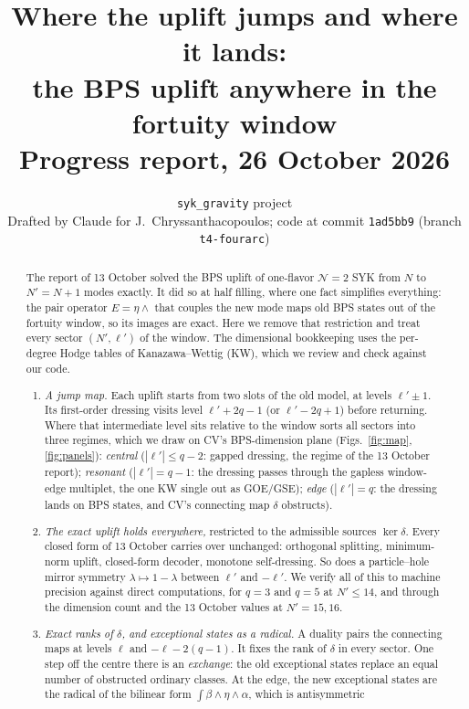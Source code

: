 \documentclass[11pt]{article}
\title{\bf Where the uplift jumps and where it lands:\\ the BPS uplift anywhere in the fortuity window\\[6pt]\large Progress report, 26 October 2026}
\author{\texttt{syk\_gravity} project\\[2pt]\small Drafted by Claude for J.~Chryssanthacopoulos; code at commit
\texttt{1ad5bb9} (branch \texttt{t4-fourarc})}
\date{}
\newcommand{\Np}{N'}
\newcommand{\lp}{\ell'}
\theoremstyle{plain}
\theoremstyle{remark}
\numberwithin{equation}{section}
\begin{document}
\maketitle

\begin{abstract}
\noindent
The report of 13 October solved the BPS uplift of one-flavor $\mathcal N=2$ SYK from $N$ to $\Np=N+1$ modes exactly. It
did so at half filling, where one fact simplifies everything: the pair operator $E=\eta\wedge$ that couples the new mode
maps old BPS states out of the fortuity window, so its images are exact. Here we remove that restriction and treat
every sector $(\Np,\lp)$ of the window. The dimensional bookkeeping uses the per-degree Hodge tables of
Kanazawa--Wettig (KW), which we review and check against our code.
\begin{enumerate}\itemsep1pt
\item \emph{A jump map.} Each uplift starts from two slots of the old model, at levels $\lp\pm1$. Its first-order
dressing visits level $\lp+2q-1$ (or $\lp-2q+1$) before returning. Where that intermediate level sits relative to the
window sorts all sectors into three regimes, which we draw on CV's BPS-dimension plane (Figs.~\ref{fig:map},
\ref{fig:panels}):
\emph{central} ($|\lp|\le q-2$: gapped dressing, the regime of the 13 October report);
\emph{resonant} ($|\lp|=q-1$: the dressing passes through the gapless window-edge multiplet, the one KW single out as
GOE/GSE);
\emph{edge} ($|\lp|=q$: the dressing lands on BPS states, and CV's connecting map $\delta$ obstructs).
\item \emph{The exact uplift holds everywhere,} restricted to the admissible sources $\ker\delta$. Every closed form of
13 October carries over unchanged: orthogonal splitting, minimum-norm uplift, closed-form decoder, monotone
self-dressing. So does a particle--hole mirror symmetry $\lambda\mapsto 1-\lambda$ between $\lp$ and $-\lp$. We verify
all of this to machine precision against direct computations, for $q=3$ and $q=5$ at $\Np\le14$, and through the
dimension count and the 13 October values at $\Np=15,16$.
\item \emph{Exact ranks of $\delta$, and exceptional states as a radical.} A duality pairs the connecting maps at levels
$\ell$ and $-\ell-2(q-1)$. It fixes the rank of $\delta$ in every sector. One step off the centre there is an
\emph{exchange}: the old exceptional states replace an equal number of obstructed ordinary classes. At the edge, the
new exceptional states are the radical of the bilinear form $\int\beta\wedge\eta\wedge\alpha$, which is antisymmetric

\end{enumerate}
\end{abstract}
\end{document}
